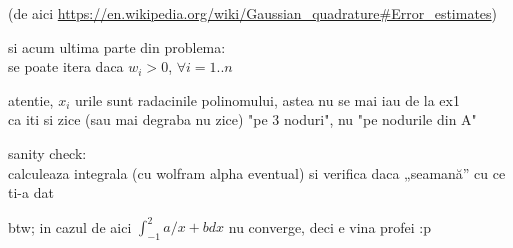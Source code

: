 \documentclass[11pt]{article}
\begin{document}
(de aici
\url{https://en.wikipedia.org/wiki/Gaussian\_quadrature\#Error\_estimates})

\medskip

si acum ultima parte din problema:\\
se poate itera daca \(w_i > 0\), \(\forall i = 1..n\)
\medskip

atentie, \(x_i\) urile sunt radacinile polinomului, astea nu se mai iau de la ex1\\
ca iti si zice (sau mai degraba nu zice) "pe 3 noduri", nu "pe nodurile din A"

sanity check:\\
calculeaza integrala (cu wolfram alpha eventual) si verifica daca „seamană” cu ce ti-a dat


btw; in cazul de aici \(\int_{-1}^{2} a/x+b dx\) nu converge, deci e vina profei :p
\end{document}

